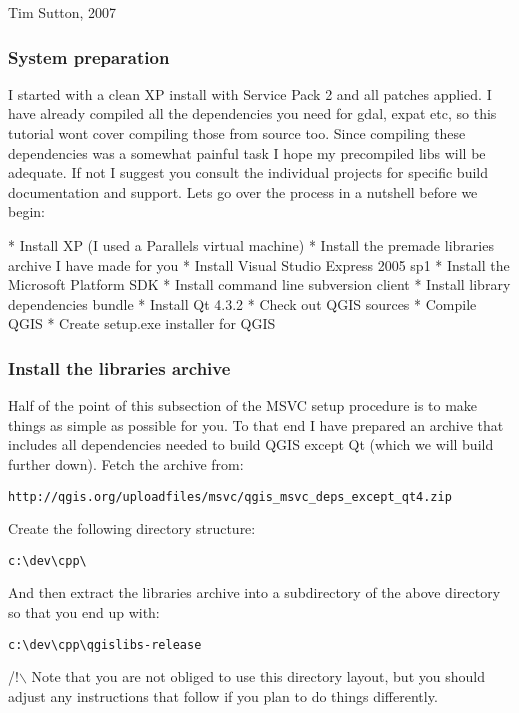 Tim Sutton, 2007

\hypertarget{toc92}{}
\subsubsection{System preparation}
I started with a clean XP install with Service Pack 2 and all patches applied.
I have already compiled all the dependencies you need for gdal, expat etc,
so this tutorial wont cover compiling those from source too. Since compiling 
these dependencies was a somewhat painful task I hope my precompiled libs 
will be adequate. If not I suggest you consult the individual projects for
specific build documentation and support. Lets go over the process in a nutshell 
before we begin:

 * Install XP (I used a Parallels virtual machine)
 * Install the premade libraries archive I have made for you
 * Install Visual Studio Express 2005 sp1
 * Install the Microsoft Platform SDK
 * Install command line subversion client
 * Install library dependencies bundle
 * Install Qt 4.3.2
 * Check out QGIS sources
 * Compile QGIS
 * Create setup.exe installer for QGIS

\hypertarget{toc93}{}
\subsubsection{Install the libraries archive}
Half of the point of this subsection of the MSVC setup procedure is to make 
things as simple as possible for you. To that end I have prepared an
archive that includes all dependencies needed to build QGIS except Qt 
(which we will build further down). Fetch the archive from:

\begin{verbatim}
http://qgis.org/uploadfiles/msvc/qgis_msvc_deps_except_qt4.zip
\end{verbatim}

Create the following directory structure:

\begin{verbatim}
c:\dev\cpp\
\end{verbatim}

And then extract the libraries archive into a subdirectory of the above
directory so that you end up with:

\begin{verbatim}
c:\dev\cpp\qgislibs-release
\end{verbatim}

/!$\backslash$ Note that you are not obliged to use this directory layout, but you 
should adjust any instructions that follow if you plan to do things 
differently.

